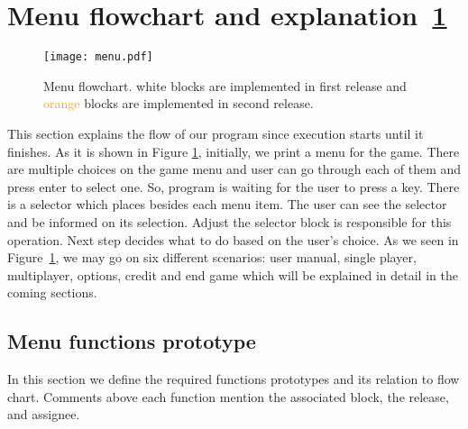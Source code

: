 \section{Menu flowchart and explanation~\ref{fig:menu}}
\begin{figure}
    \centering 
    \texttt{[image: menu.pdf]}
    \caption{Menu flowchart. white blocks are implemented in first release and \textcolor{orange}{orange} blocks are implemented in second release. }
    \label{fig:menu}
\end{figure}

This section explains the flow of our program since execution starts until it finishes. 
As it is shown in Figure \ref{fig:menu}, initially, we print a menu for the game. There are multiple choices on the game menu and user can go through each of them and press enter to select one. So, program is waiting for the user to press a key.
There is a selector which places besides each menu item. The user can see the selector and be informed on its selection. Adjust the selector block is responsible for this operation.
Next step decides what to do based on the user's choice. 
As we seen in Figure~\ref{fig:menu}, we may go on six different scenarios: user manual, single player, multiplayer, options, credit and end game which will be explained in detail in the coming sections.

\subsection{Menu functions prototype}
In this section we define the required functions prototypes and its relation to flow chart. Comments above each function mention the associated block, the release, and assignee.

